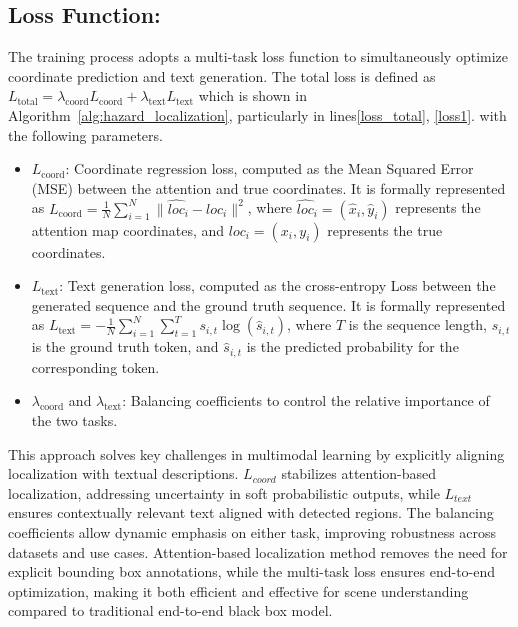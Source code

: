 \subsection{Loss Function:}
The training process adopts a multi-task loss function to simultaneously optimize coordinate prediction and text generation. The total loss is defined as $L_{\text{total}} = \lambda_{\text{coord}} L_{\text{coord}} + \lambda_{\text{text}} L_{\text{text}}$ which is shown in Algorithm~\ref{alg:hazard_localization}, particularly in lines\ref{loss_total}, \ref{loss1}.
with the following parameters.
\begin{itemize}
    \item \(L_{\text{coord}}\): Coordinate regression loss, computed as the Mean Squared Error (MSE) between the attention and true coordinates. It is formally represented as $L_{\text{coord}} = \frac{1}{N} \sum_{i=1}^{N} \| \hat{loc}_i - loc_i \|^2$,
    where \(\hat{loc}_i = (\hat{x}_i, \hat{y}_i)\) represents the attention map coordinates, and \(loc_i = (x_i, y_i)\) represents the true coordinates.
    \item \(L_{\text{text}}\): Text generation loss, computed as the cross-entropy Loss between the generated sequence and the ground truth sequence. It is formally represented as $L_{\text{text}} = -\frac{1}{N} \sum_{i=1}^{N} \sum_{t=1}^{T} s_{i,t} \log(\hat{s}_{i,t})$, 
    where \(T\) is the sequence length, \(s_{i,t}\) is the ground truth token, and \(\hat{s}_{i,t}\) is the predicted probability for the corresponding token.
    \item \(\lambda_{\text{coord}}\) and \(\lambda_{\text{text}}\): Balancing coefficients to control the relative importance of the two tasks.
\end{itemize}
% 
This approach solves key challenges in multimodal learning by explicitly aligning localization with textual descriptions. $L_{coord}$ stabilizes attention-based localization, addressing uncertainty in soft probabilistic outputs, while $L_{text}$ ensures contextually relevant text aligned with detected regions. The balancing coefficients allow dynamic emphasis on either task, improving robustness across datasets and use cases.
% 
Attention-based localization method removes the need for explicit bounding box annotations, while the multi-task loss ensures end-to-end optimization, making it both efficient and effective for scene understanding compared to traditional end-to-end black box model.
% 
